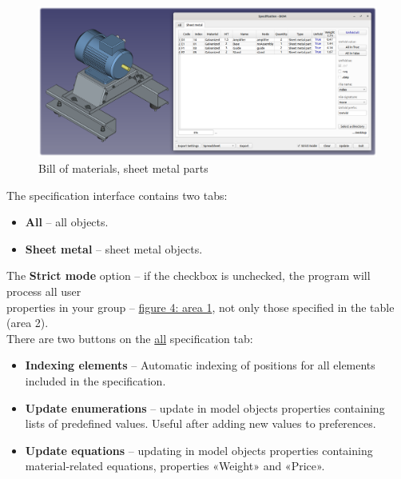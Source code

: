 \documentclass[a4paper,12pt]{article}
\begin{document}
\begin{figure}[htp]
	\centering
	\includegraphics[width=1\textwidth]{img/specification_sm.png}
	\caption{Bill of materials, sheet metal parts}
	\label{sec:specification_sm}
\end{figure}

The specification interface contains two tabs:
\begin{itemize}
	\item \textbf{All} -- all objects.
	\item \textbf{Sheet metal} -- sheet metal objects.\\
\end{itemize}

\pagebreak

The \textbf{Strict mode} option -- if the checkbox is unchecked, the program will process all user\\ properties in your group -- \hyperref[sec:pref_specification]{figure 4: area 1}, not only those specified in the table (area 2).\\

There are two buttons on the \hyperref[sec:specification_sm]{all} specification tab:
\begin{itemize}
	\item \textbf{Indexing elements} -- Automatic indexing of positions for all elements\\included in the specification.
	\item \textbf{Update enumerations} -- update in model objects properties containing\\lists of predefined values. Useful after adding new values ​​to preferences.
	\item \textbf{Update equations} -- updating in model objects properties containing material-related equations, properties «Weight» and «Price».\\
\end{itemize}
\end{document}
